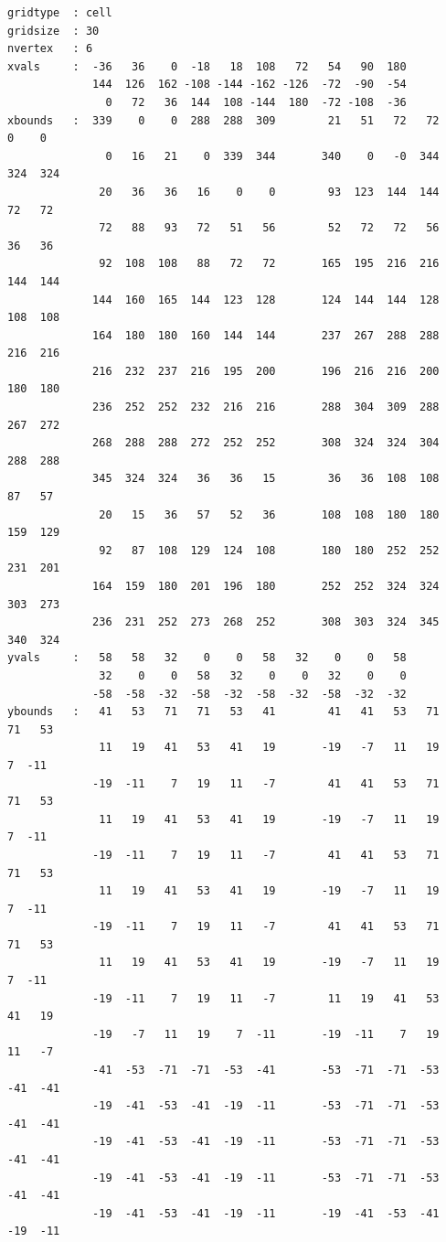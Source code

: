 \begin{lstlisting}[frame=single, backgroundcolor=\color{zebg}, basicstyle=\footnotesize]
gridtype  : cell
gridsize  : 30
nvertex   : 6
xvals     :  -36   36    0  -18   18  108   72   54   90  180 
             144  126  162 -108 -144 -162 -126  -72  -90  -54
               0   72   36  144  108 -144  180  -72 -108  -36 
xbounds   :  339    0    0  288  288  309        21   51   72   72    0    0
               0   16   21    0  339  344       340    0   -0  344  324  324
              20   36   36   16    0    0        93  123  144  144   72   72
              72   88   93   72   51   56        52   72   72   56   36   36
              92  108  108   88   72   72       165  195  216  216  144  144
             144  160  165  144  123  128       124  144  144  128  108  108
             164  180  180  160  144  144       237  267  288  288  216  216
             216  232  237  216  195  200       196  216  216  200  180  180
             236  252  252  232  216  216       288  304  309  288  267  272
             268  288  288  272  252  252       308  324  324  304  288  288
             345  324  324   36   36   15        36   36  108  108   87   57
              20   15   36   57   52   36       108  108  180  180  159  129
              92   87  108  129  124  108       180  180  252  252  231  201
             164  159  180  201  196  180       252  252  324  324  303  273
             236  231  252  273  268  252       308  303  324  345  340  324
yvals     :   58   58   32    0    0   58   32    0    0   58
              32    0    0   58   32    0    0   32    0    0
             -58  -58  -32  -58  -32  -58  -32  -58  -32  -32 
ybounds   :   41   53   71   71   53   41        41   41   53   71   71   53
              11   19   41   53   41   19       -19   -7   11   19    7  -11
             -19  -11    7   19   11   -7        41   41   53   71   71   53
              11   19   41   53   41   19       -19   -7   11   19    7  -11
             -19  -11    7   19   11   -7        41   41   53   71   71   53
              11   19   41   53   41   19       -19   -7   11   19    7  -11
             -19  -11    7   19   11   -7        41   41   53   71   71   53
              11   19   41   53   41   19       -19   -7   11   19    7  -11
             -19  -11    7   19   11   -7        11   19   41   53   41   19
             -19   -7   11   19    7  -11       -19  -11    7   19   11   -7
             -41  -53  -71  -71  -53  -41       -53  -71  -71  -53  -41  -41
             -19  -41  -53  -41  -19  -11       -53  -71  -71  -53  -41  -41
             -19  -41  -53  -41  -19  -11       -53  -71  -71  -53  -41  -41
             -19  -41  -53  -41  -19  -11       -53  -71  -71  -53  -41  -41
             -19  -41  -53  -41  -19  -11       -19  -41  -53  -41  -19  -11
\end{lstlisting}

